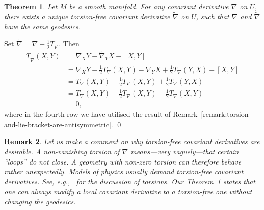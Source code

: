 \documentclass[11pt,a4paper,twoside,openany]{report}
\theoremstyle{my-theorem}
\newtheorem{theorem}{Theorem}[section]
\theoremstyle{non-theorem}
\newtheorem{remark}[theorem]{Remark}
\renewenvironment{proof}[1][\proofname]{{\scshape #1. }}{\qed}
\begin{document}
			\begin{theorem}
				\label{thm:there-always-exists-a-torsion-free-covariant-derivative}
				Let $M$ be a smooth manifold. For any covariant derivative $\nabla$ on $U$, there exists a unique torsion-free covariant derivative $\tilde\nabla$ on $U$, such that $\nabla$ and $\tilde\nabla$ have the same geodesics.
			\end{theorem}
		
			\begin{proof}
				Set $\tilde\nabla = \nabla - \frac 12 T_\nabla$. Then
				\begin{align*}
					T_{\tilde\nabla}(X,Y) &= \tilde\nabla_XY - \tilde\nabla_YX - [X,Y]
				\\
					&= \nabla_XY - \frac 12 T_\nabla(X,Y) - \nabla_YX + \frac 12 T_\nabla(Y,X) - [X,Y]
				\\
					&= T_\nabla(X,Y) - \frac 12 T_\nabla(X,Y) + \frac 12 T_\nabla(Y,X)
				\\
					&= T_\nabla(X,Y) - \frac 12 T_\nabla(X,Y) - \frac 12 T_\nabla(X,Y)
				\\
					&= 0,
				\end{align*}
				where in the fourth row we have utilised the result of Remark~\ref{remark:torsion-and-lie-bracket-are-antisymmetric}.
			\end{proof}
			
			\begin{remark}
				Let us make a comment on why torsion-free covariant derivatives are desirable. A non-vanishing torsion of $\nabla$ means---very vaguely---that certain ``loops'' do not close. A geometry with non-zero torsion can therefore behave rather unexpectedly. Models of physics usually demand torsion-free covariant derivatives. See, e.g.,~\cite{frankel:the-geometry-of-physics-an-introduction} for the discussion of torsions. Our Theorem~\ref{thm:there-always-exists-a-torsion-free-covariant-derivative} states that one can \emph{always} modify a local covariant derivative to a torsion-free one \emph{without} changing the geodesics.
			\end{remark}
			
\end{document}
